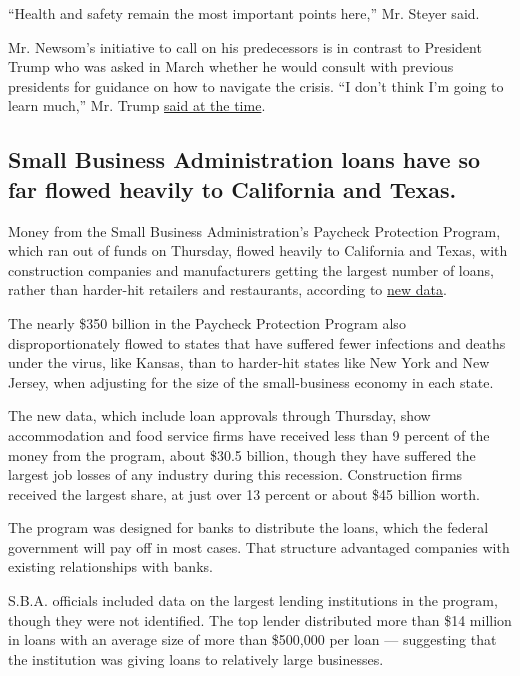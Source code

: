 ``Health and safety remain the most important points here,'' Mr. Steyer
said.

Mr. Newsom's initiative to call on his predecessors is in contrast to
President Trump who was asked in March whether he would consult with
previous presidents for guidance on how to navigate the crisis. ``I
don't think I'm going to learn much,'' Mr. Trump
\href{https://slack-redir.net/link?url=https\%3A\%2F\%2Fwww.whitehouse.gov\%2Fbriefings-statements\%2Fremarks-president-trump-vice-president-pence-members-coronavirus-task-force-press-briefing-8\%2F\&v=3}{said
at the time}.

\hypertarget{small-business-administration-loans-have-so-far-flowed-heavily-to-california-and-texas}{%
\subsection{Small Business Administration loans have so far flowed
heavily to California and
Texas.}\label{small-business-administration-loans-have-so-far-flowed-heavily-to-california-and-texas}}

Money from the Small Business Administration's Paycheck Protection
Program, which ran out of funds on Thursday, flowed heavily to
California and Texas, with construction companies and manufacturers
getting the largest number of loans, rather than harder-hit retailers
and restaurants, according to
\href{https://home.treasury.gov/system/files/136/SBA\%20PPP\%20Loan\%20Report\%20Deck.pdf}{new
data}.

The nearly \$350 billion in the Paycheck Protection Program also
disproportionately flowed to states that have suffered fewer infections
and deaths under the virus, like Kansas, than to harder-hit states like
New York and New Jersey, when adjusting for the size of the
small-business economy in each state.

The new data, which include loan approvals through Thursday, show
accommodation and food service firms have received less than 9 percent
of the money from the program, about \$30.5 billion, though they have
suffered the largest job losses of any industry during this recession.
Construction firms received the largest share, at just over 13 percent
or about \$45 billion worth.

The program was designed for banks to distribute the loans, which the
federal government will pay off in most cases. That structure advantaged
companies with existing relationships with banks.

S.B.A. officials included data on the largest lending institutions in
the program, though they were not identified. The top lender distributed
more than \$14 million in loans with an average size of more than
\$500,000 per loan --- suggesting that the institution was giving loans
to relatively large businesses.

